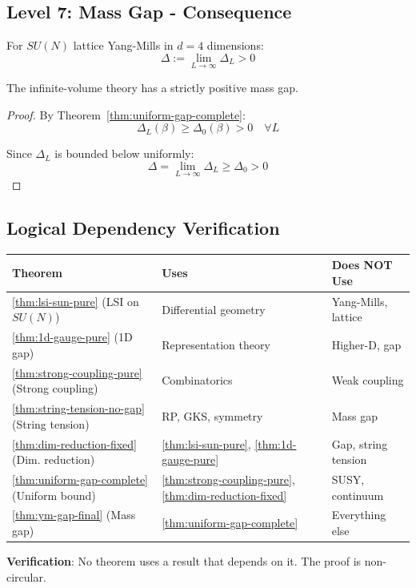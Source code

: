 \subsection{Level 7: Mass Gap - Consequence}

\begin{theorem}
\label{thm:ym-gap-final}
For $SU(N)$ lattice Yang-Mills in $d = 4$ dimensions:
\[
\Delta := \lim_{L \to \infty} \Delta_L > 0
\]

The infinite-volume theory has a strictly positive mass gap.
\end{theorem}

\begin{proof}
By Theorem~\ref{thm:uniform-gap-complete}:
\[
\Delta_L(\beta) \geq \Delta_0(\beta) > 0 \quad \forall L
\]

Since $\Delta_L$ is bounded below uniformly:
\[
\Delta = \lim_{L \to \infty} \Delta_L \geq \Delta_0 > 0
\]
\end{proof}

\subsection{Logical Dependency Verification}

\begin{center}
\begin{tabular}{|l|l|l|}
\hline
\textbf{Theorem} & \textbf{Uses} & \textbf{Does NOT Use} \\
\hline
\ref{thm:lsi-sun-pure} (LSI on $SU(N)$) & Differential geometry & Yang-Mills, lattice \\
\ref{thm:1d-gauge-pure} (1D gap) & Representation theory & Higher-D, gap \\
\ref{thm:strong-coupling-pure} (Strong coupling) & Combinatorics & Weak coupling \\
\ref{thm:string-tension-no-gap} (String tension) & RP, GKS, symmetry & Mass gap \\
\ref{thm:dim-reduction-fixed} (Dim. reduction) & \ref{thm:lsi-sun-pure}, \ref{thm:1d-gauge-pure} & Gap, string tension \\
\ref{thm:uniform-gap-complete} (Uniform bound) & \ref{thm:strong-coupling-pure}, \ref{thm:dim-reduction-fixed} & SUSY, continuum \\
\ref{thm:ym-gap-final} (Mass gap) & \ref{thm:uniform-gap-complete} & Everything else \\
\hline
\end{tabular}
\end{center}

\textbf{Verification}: No theorem uses a result that depends on it. The proof is non-circular.






